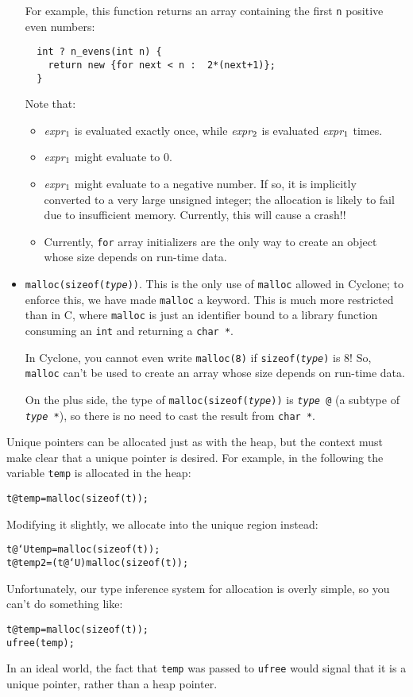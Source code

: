 \begin{itemize}
  For example, this function returns an array containing the first
  \texttt{n} positive even numbers:
\begin{verbatim}
  int ? n_evens(int n) {
    return new {for next < n :  2*(next+1)};
  }
\end{verbatim}

  Note that:
  \begin{itemize}
  \item {\it expr}\(\sb{1}\) is evaluated exactly once, while {\it
      expr}\(\sb{2}\) is evaluated {\it expr}\(\sb{1}\) times.
  \item {\it expr}\(\sb{1}\) might evaluate to 0.
  \item {\it expr}\(\sb{1}\) might evaluate to a negative number.
    If so, it is implicitly converted to a very large unsigned
    integer; the allocation is likely to fail due to insufficient
    memory.  Currently, this will cause a crash!!
  \item Currently, \texttt{for} array initializers are the only way to
    create an object whose size depends on run-time data.
  \end{itemize}
  
\item \texttt{malloc(sizeof({\it type}))}.  This is the only use of
  \texttt{malloc} allowed in Cyclone; to enforce this, we have made
  \texttt{malloc} a keyword.  This is much more restricted
  than in C, where \texttt{malloc} is just an identifier bound to a
  library function consuming an \texttt{int} and returning a
  \texttt{char *}.

  In Cyclone, you cannot even write \texttt{malloc(8)} if
  \texttt{sizeof({\it type})} is 8!  So, \texttt{malloc} can't be used
  to create an array whose size depends on run-time data.
  
  On the plus side, the type of \texttt{malloc(sizeof({\it type}))} is
  \texttt{{\it type} @} (a subtype of \texttt{{\it type} *}),
  so there is no need to cast the result from \texttt{char *}.
\end{itemize}

Unique pointers can be allocated just as with the heap, but the context must
make clear that a unique pointer is desired.  For example, in the following
the variable \texttt{temp} is allocated in the heap:
\begin{alltt}
  t @ temp = malloc(sizeof(t));
\end{alltt}
Modifying it slightly, we allocate into the unique region instead:
\begin{alltt}
  t @`U temp  =        malloc(sizeof(t));
  t @   temp2 = (t @`U)malloc(sizeof(t));
\end{alltt}
Unfortunately, our type inference system for allocation is overly simple, so
you can't do something like:
\begin{alltt}
  t @ temp = malloc(sizeof(t));
  ufree(temp);
\end{alltt}
In an ideal world, the fact that \texttt{temp} was passed to \texttt{ufree}
would signal that it is a unique pointer, rather than a heap pointer.

